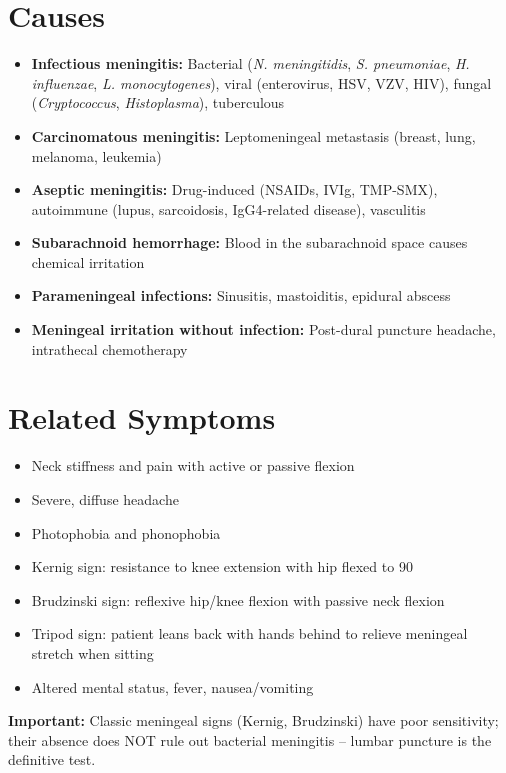 \section*{Causes}
\begin{itemize}
  \item \textbf{Infectious meningitis:} Bacterial (\textit{N. meningitidis}, \textit{S. pneumoniae}, \textit{H. influenzae}, \textit{L. monocytogenes}), viral (enterovirus, HSV, VZV, HIV), fungal (\textit{Cryptococcus}, \textit{Histoplasma}), tuberculous
  \item \textbf{Carcinomatous meningitis:} Leptomeningeal metastasis (breast, lung, melanoma, leukemia)
  \item \textbf{Aseptic meningitis:} Drug-induced (NSAIDs, IVIg, TMP-SMX), autoimmune (lupus, sarcoidosis, IgG4-related disease), vasculitis
  \item \textbf{Subarachnoid hemorrhage:} Blood in the subarachnoid space causes chemical irritation
  \item \textbf{Parameningeal infections:} Sinusitis, mastoiditis, epidural abscess
  \item \textbf{Meningeal irritation without infection:} Post-dural puncture headache, intrathecal chemotherapy
\end{itemize}

\section*{Related Symptoms}
\begin{itemize}
  \item Neck stiffness and pain with active or passive flexion
  \item Severe, diffuse headache
  \item Photophobia and phonophobia
  \item Kernig sign: resistance to knee extension with hip flexed to 90\textdegree
  \item Brudzinski sign: reflexive hip/knee flexion with passive neck flexion
  \item Tripod sign: patient leans back with hands behind to relieve meningeal stretch when sitting
  \item Altered mental status, fever, nausea/vomiting
\end{itemize}
\textbf{Important:} Classic meningeal signs (Kernig, Brudzinski) have poor sensitivity; their absence does NOT rule out bacterial meningitis -- lumbar puncture is the definitive test.

